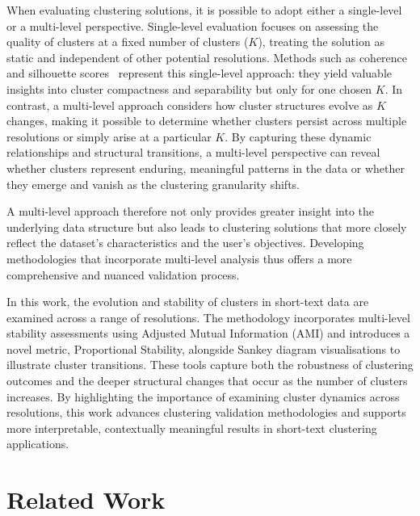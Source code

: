 \documentclass{article}
\begin{document}
When evaluating clustering solutions, it is possible to adopt either a single-level or a multi-level perspective. Single-level evaluation focuses on assessing the quality of clusters at a fixed number of clusters ($K$), treating the solution as static and independent of other potential resolutions. Methods such as coherence~\cite{stevensExploringTopicCoherence2012} and silhouette scores~\cite{rousseeuwSilhouettesGraphicalAid1987} represent this single-level approach: they yield valuable insights into cluster compactness and separability but only for one chosen $K$. In contrast, a multi-level approach considers how cluster structures evolve as $K$ changes, making it possible to determine whether clusters persist across multiple resolutions or simply arise at a particular $K$. By capturing these dynamic relationships and structural transitions, a multi-level perspective can reveal whether clusters represent enduring, meaningful patterns in the data or whether they emerge and vanish as the clustering granularity shifts.

A multi-level approach therefore not only provides greater insight into the underlying data structure but also leads to clustering solutions that more closely reflect the dataset’s characteristics and the user’s objectives. Developing methodologies that incorporate multi-level analysis thus offers a more comprehensive and nuanced validation process.

In this work, the evolution and stability of clusters in short-text data are examined across a range of resolutions. The methodology incorporates multi-level stability assessments using Adjusted Mutual Information (AMI) and introduces a novel metric, Proportional Stability, alongside Sankey diagram visualisations to illustrate cluster transitions. These tools capture both the robustness of clustering outcomes and the deeper structural changes that occur as the number of clusters increases. By highlighting the importance of examining cluster dynamics across resolutions, this work advances clustering validation methodologies and supports more interpretable, contextually meaningful results in short-text clustering applications.



\section{Related Work}
\end{document}
